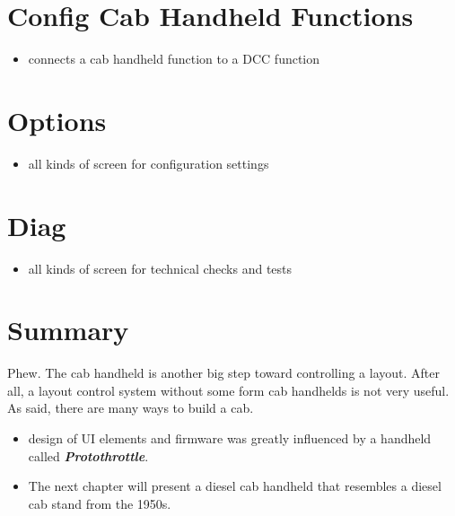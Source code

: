 \section{Config Cab Handheld Functions}

\begin{itemize}
\item connects a cab handheld function to a DCC function
\end{itemize}

\section{Options}

\begin{itemize}
\item all kinds of screen for configuration settings
\end{itemize}

\section{Diag}

\begin{itemize}
\item all kinds of screen for technical checks and tests
\end{itemize}

\section{Summary}

Phew. The cab handheld is another big step toward controlling a layout. After all, a layout control system without some form cab handhelds is not very useful. As said, there are many ways to build a cab.

\begin{itemize}
\item design of UI elements and firmware was greatly influenced by a handheld called \textbf{\textit{Protothrottle}}.
\item The next chapter will present a diesel cab handheld that resembles a diesel cab stand from the 1950s.
\end{itemize}
